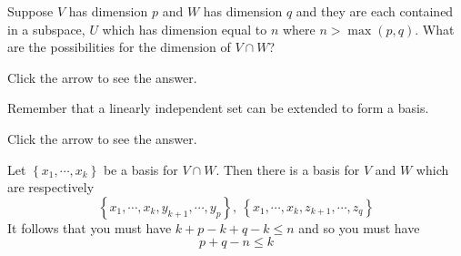 \documentclass{ximera}
\begin{document}
\begin{problem}\label{prb:5.29} Suppose $V$ has dimension $p$ and $W$ has dimension $q$ and they
are each contained in a subspace, $U$ which has dimension equal to $n$ where
$n>\max \left( p,q\right).$ What are the possibilities for the dimension of
$V\cap W$? 

Click the arrow to see the answer.  
\begin{expandable}
Remember that a linearly independent set can be extended to form a basis.

Click the arrow to see the answer.
\begin{expandable}
Let $\left\{ x_{1},\cdots ,x_{k}\right\} $ be a
basis for $V\cap W.$ Then there is a basis for $V$ and $W$ which are
respectively
\[
\left\{ x_{1},\cdots ,x_{k},y_{k+1},\cdots ,y_{p}\right\} ,\ \left\{
x_{1},\cdots ,x_{k},z_{k+1},\cdots ,z_{q}\right\}
\]
It follows that you must have $k+p-k+q-k\leq n$ and so you must have
\[
p+q-n\leq k
\]
\end{expandable}
\end{expandable}
\end{problem}
\end{document}
